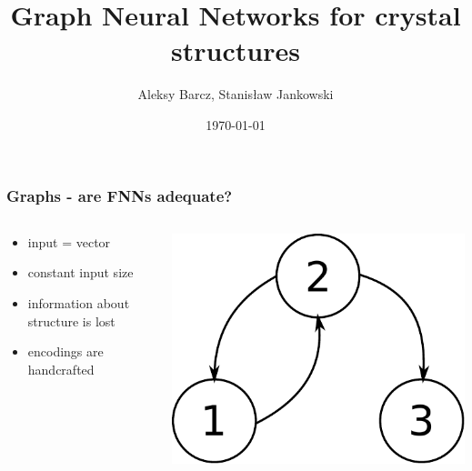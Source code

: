 \documentclass{beamer}
\author{Aleksy Barcz, Stanisław Jankowski}
\title{Graph Neural Networks for crystal structures}
\date{\today}
\institute{Warsaw University of Technology}
\begin{document}
\frame{\titlepage}

\begin{frame}
\frametitle{Graphs - are FNNs adequate?}
\begin{columns}
	\begin{column}{0.66\textwidth}
		\begin{itemize}
			\item input = vector
			\item constant input size
			\item information about structure is lost
			\item encodings are handcrafted
		\end{itemize}
	\end{column}
	\begin{column}{0.34\textwidth}
		\includegraphics[scale=0.4]{img/graph}
	\end{column}
\end{columns}
\end{frame}
\end{document}
